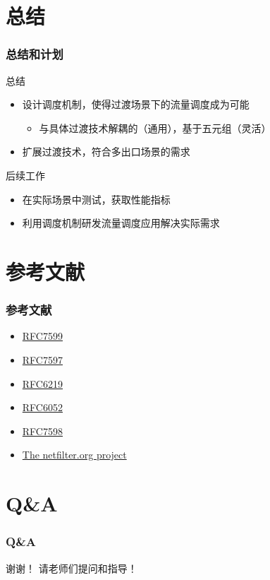 \documentclass{beamer}
\begin{document}
\section{总结}
\begin{frame}
  \frametitle{总结和计划}

  \begin{block}{总结}
    \begin{itemize}
    \item 设计调度机制，使得过渡场景下的流量调度成为可能
      \begin{itemize}
      \item 与具体过渡技术解耦的（通用），基于五元组（灵活）
      \end{itemize}
    \item 扩展过渡技术，符合多出口场景的需求
    \end{itemize}
  \end{block}

  \begin{block}{后续工作}
    \begin{itemize}
    \item 在实际场景中测试，获取性能指标
    \item 利用调度机制研发流量调度应用解决实际需求
    \end{itemize}
  \end{block}
\end{frame}

\section{参考文献}
\begin{frame}
  \frametitle{参考文献}
  \begin{itemize}
  \item \href{https://tools.ietf.org/html/rfc7599}{RFC7599}
  \item \href{https://tools.ietf.org/html/rfc7597}{RFC7597}
  \item \href{https://tools.ietf.org/html/rfc6219}{RFC6219}
  \item \href{https://tools.ietf.org/html/rfc6052}{RFC6052}
  \item \href{https://tools.ietf.org/html/rfc7598}{RFC7598}
  \item \href{http://www.netfilter.org}{The netfilter.org project}
  \end{itemize}
\end{frame}

\section{Q\&A}

\begin{frame}
  \frametitle{Q\&A}
  \begin{center}
    {\LARGE 谢谢！}
    \vspace{3em}
    {\LARGE 请老师们提问和指导！}
  \end{center}
\end{frame}
\end{document}
